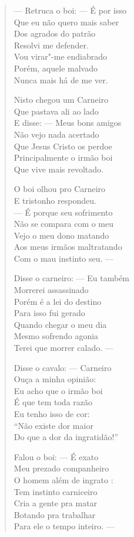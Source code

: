 \begin{verse}
---  Retruca o boi: ---  É por isso \\
Que eu não quero mais saber \\
Dos agrados do patrão \\
Resolvi me defender. \\
Vou virar"-me endiabrado \\
Porém, aquele malvado \\
Nunca mais há de me ver. 


Nisto chegou um Carneiro \\
Que pastava ali ao lado \\
E disse: ---  Meus bons amigos \\
Não vejo nada acertado \\
Que Jesus Cristo os perdoe \\
Principalmente o irmão boi \\
Que vive mais revoltado. 

O boi olhou pro Carneiro \\
E tristonho respondeu. \\
---  É porque seu sofrimento \\
Não se compara com o meu \\
Vejo o meu dono matando \\
Aos meus irmãos maltratando \\
Com o mau instinto seu. ---

Disse o carneiro: ---  Eu também \\
Morrerei assassinado \\
Porém é a lei do destino \\
Para isso fui gerado \\
Quando chegar o meu dia \\
Mesmo sofrendo agonia \\
Terei que morrer calado. ---

Disse o cavalo: ---  Carneiro \\
Ouça a minha opinião: \\
Eu acho que o irmão boi \\
É que tem toda razão \\
Eu tenho isso de cor: \\
``Não existe dor maior \\
Do que a dor da ingratidão!'' 


Falou o boi: ---  É exato \\
Meu prezado companheiro \\
O homem além de ingrato :\\
Tem instinto carniceiro \\
Cria a gente pra matar \\
Botando pra trabalhar \\
Para ele o tempo inteiro. ---


\end{verse}
